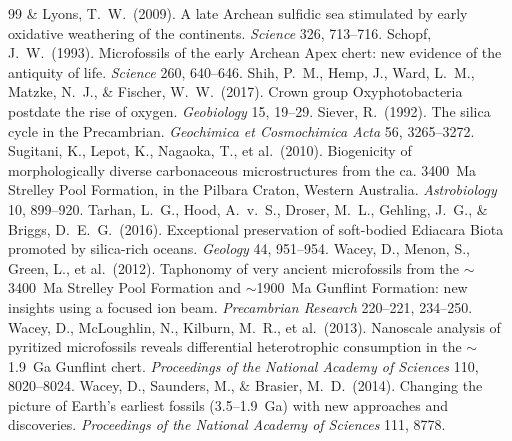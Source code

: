 \documentclass[11pt]{article}
\begin{document}
\begin{thebibliography}{99}
\& Lyons, T.~W.\ (2009). A late Archean sulfidic sea stimulated by early oxidative weathering of the
continents. \textit{Science} 326, 713--716.
 Schopf, J.~W.\ (1993). Microfossils of the early Archean Apex
chert: new evidence of the antiquity of life. \textit{Science} 260, 640--646.
 Shih, P.~M., Hemp, J., Ward, L.~M., Matzke, N.~J., \& Fischer,
W.~W.\ (2017). Crown group Oxyphotobacteria postdate the rise of oxygen. \textit{Geobiology} 15,
19--29.
 Siever, R.\ (1992). The silica cycle in the Precambrian.
\textit{Geochimica et Cosmochimica Acta} 56, 3265--3272.
 Sugitani, K., Lepot, K., Nagaoka, T., et al.\ (2010).
Biogenicity of morphologically diverse carbonaceous microstructures from the ca. 3400~Ma Strelley
Pool Formation, in the Pilbara Craton, Western Australia. \textit{Astrobiology} 10, 899--920.
 Tarhan, L.~G., Hood, A.~v.~S., Droser, M.~L., Gehling, J.~G.,
\& Briggs, D.~E.~G.\ (2016). Exceptional preservation of soft-bodied Ediacara Biota promoted by
silica-rich oceans. \textit{Geology} 44, 951--954.
 Wacey, D., Menon, S., Green, L., et al.\ (2012). Taphonomy of
very ancient microfossils from the $\sim$3400~Ma Strelley Pool Formation and $\sim$1900~Ma Gunflint
Formation: new insights using a focused ion beam. \textit{Precambrian Research} 220--221, 234--250.
 Wacey, D., McLoughlin, N., Kilburn, M.~R., et al.\ (2013).
Nanoscale analysis of pyritized microfossils reveals differential heterotrophic consumption in the
$\sim$1.9~Ga Gunflint chert. \textit{Proceedings of the National Academy of Sciences} 110,
8020--8024.
 Wacey, D., Saunders, M., \& Brasier, M.~D.\ (2014).
Changing the picture of Earth's earliest fossils (3.5--1.9~Ga) with new approaches and discoveries.
\textit{Proceedings of the National Academy of Sciences} 111, 8778.
\end{thebibliography}
\end{document}
